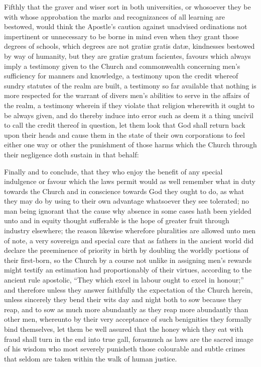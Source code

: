 Fifthly that the graver and wiser sort in both universities, or whosoever they be with whose approbation the marks and recognizances of all learning are bestowed, would think the Apostle’s caution against unadvised ordinations not impertinent or unnecessary to be borne in mind even when they grant those degrees of schools, which degrees are not gratiæ gratis datæ, kindnesses bestowed by way of humanity, but they are gratiæ gratum facientes, favours which always imply a testimony given to the Church and commonwealth concerning men’s sufficiency for manners and knowledge, a testimony upon the credit whereof sundry statutes of the realm are built, a testimony so far available that nothing is more respected for the warrant of divers men’s abilities to serve in the affairs of the realm, a testimony wherein if they violate that religion wherewith it ought to be always given, and do thereby induce into error such as deem it a thing uncivil to call the credit thereof in question, let them look that God shall return back upon their heads and cause them in the state of their own corporations to feel either one way or other the punishment of those harms which the Church through their negligence doth sustain in that behalf:

Finally and to conclude, that they who enjoy the benefit of any special indulgence or favour which the laws permit would as well remember what in duty towards the Church and in conscience towards God they ought to do, as what they may do by using to their own advantage whatsoever they see tolerated; no man being ignorant that the cause why absence in some cases hath been yielded unto and in equity thought sufferable is the hope of greater fruit through industry elsewhere; the reason likewise wherefore pluralities are allowed unto men of note, a very sovereign and special care that as fathers in the ancient world did declare the preeminence of priority in birth by doubling the worldly portions of their first-born, so the Church by a course not unlike in assigning men’s rewards might testify an estimation had proportionably of their virtues, according to the  ancient rule apostolic, “They which excel in labour ought to excel in honour;”
 and therefore unless they answer faithfully the expectation of the Church herein, unless sincerely they bend their wits day and night both to sow because they reap, and to sow as much more abundantly as they reap more abundantly than other men, whereunto by their very acceptance of such benignities they formally bind themselves, let them be well assured that the honey which they eat with fraud shall turn in the end into true gall, forasmuch as laws are the sacred image of his wisdom who most severely punisheth those colourable and subtle crimes that seldom are taken within the walk of human justice.

